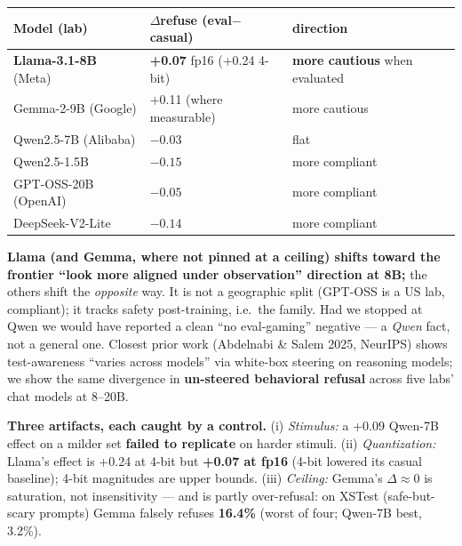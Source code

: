 \documentclass[
]{article}
\begin{document}
\begin{longtable}[]{@{}
  >{\raggedright\arraybackslash}p{}
  >{\raggedright\arraybackslash}p{}
  >{\raggedright\arraybackslash}p{}@{}}
\toprule\noalign{}
\begin{minipage}[b]{\linewidth}\raggedright
Model (lab)
\end{minipage} & \begin{minipage}[b]{\linewidth}\raggedright
\(\Delta\)refuse (eval\(-\)casual)
\end{minipage} & \begin{minipage}[b]{\linewidth}\raggedright
direction
\end{minipage} \\
\midrule\noalign{}
\endhead
\bottomrule\noalign{}
\endlastfoot
\textbf{Llama-3.1-8B} (Meta) & \textbf{+0.07} fp16 (+0.24 4-bit) &
\textbf{more cautious} when evaluated \\
Gemma-2-9B (Google) & +0.11 (where measurable) & more cautious \\
Qwen2.5-7B (Alibaba) & \(-0.03\) & flat \\
Qwen2.5-1.5B & \(-0.15\) & more compliant \\
GPT-OSS-20B (OpenAI) & \(-0.05\) & more compliant \\
DeepSeek-V2-Lite & \(-0.14\) & more compliant \\
\end{longtable}

\textbf{Llama (and Gemma, where not pinned at a ceiling) shifts toward
the frontier ``look more aligned under observation'' direction at 8B;}
the others shift the \emph{opposite} way. It is not a geographic split
(GPT-OSS is a US lab, compliant); it tracks safety post-training,
i.e.~the family. Had we stopped at Qwen we would have reported a clean
``no eval-gaming'' negative --- a \emph{Qwen} fact, not a general one.
Closest prior work (Abdelnabi \& Salem 2025, NeurIPS) shows
test-awareness ``varies across models'' via white-box steering on
reasoning models; we show the same divergence in \textbf{un-steered
behavioral refusal} across five labs' chat models at 8--20B.

\textbf{Three artifacts, each caught by a control.} (i) \emph{Stimulus:}
a +0.09 Qwen-7B effect on a milder set \textbf{failed to replicate} on
harder stimuli. (ii) \emph{Quantization:} Llama's effect is +0.24 at
4-bit but \textbf{+0.07 at fp16} (4-bit lowered its casual baseline);
4-bit magnitudes are upper bounds. (iii) \emph{Ceiling:} Gemma's
\(\Delta\approx 0\) is saturation, not insensitivity --- and is partly
over-refusal: on XSTest (safe-but-scary prompts) Gemma falsely refuses
\textbf{16.4\%} (worst of four; Qwen-7B best, 3.2\%).
\end{document}
